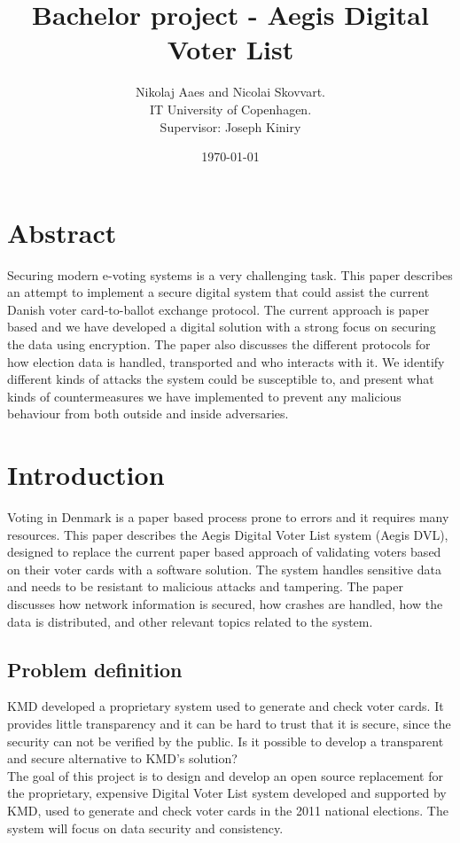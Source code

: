 \documentclass[a4paper]{report}
\title{\textbf{Bachelor project - Aegis Digital Voter List}}
\date{\today}
\author{Nikolaj Aaes and Nicolai Skovvart.\\IT University of Copenhagen.\\Supervisor: Joseph Kiniry}
\begin{document}
\maketitle

\chapter*{Abstract}
Securing modern e-voting systems is a very challenging task. This paper describes an attempt to implement a secure digital system that could assist the current Danish voter card-to-ballot exchange protocol. The current approach is paper based and we have developed a digital solution with a strong focus on securing the data using encryption. The paper also discusses the different protocols for how election data is handled, transported and who interacts with it. We identify different kinds of attacks the system could be susceptible to, and present what kinds of countermeasures we have implemented to prevent any malicious behaviour from both outside and inside adversaries.

\tableofcontents

\chapter{Introduction}
Voting in Denmark is a paper based process prone to errors and it requires many resources. This paper describes the Aegis Digital Voter List system (Aegis DVL), designed to replace the current paper based approach of validating voters based on their voter cards with a software solution. The system handles sensitive data and needs to be resistant to malicious attacks and tampering. The paper discusses how network information is secured, how crashes are handled, how the data is distributed, and other relevant topics related to the system.

\section{Problem definition}
KMD developed a proprietary system used to generate and check voter cards. It provides little transparency and it can be hard to trust that it is secure, since the security can not be verified by the public. Is it possible to develop a transparent and secure alternative to KMD's solution? \\

The goal of this project is to design and develop an open source replacement for the proprietary, expensive Digital Voter List system developed and supported by KMD, used to generate and check voter cards in the 2011 national elections. The system will focus on data security and consistency. \\
\end{document}
